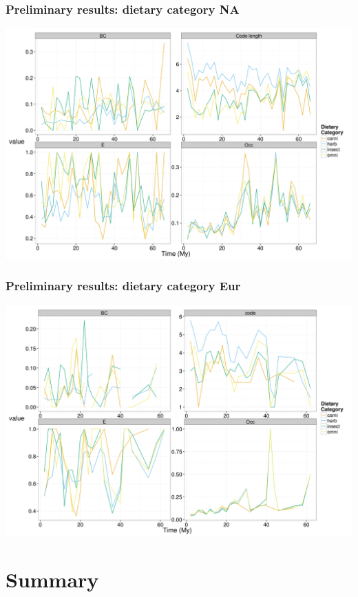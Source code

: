 \documentclass{beamer}
\begin{document}
\begin{frame}
  \frametitle{Preliminary results: dietary category NA}

  \begin{center}
    \includegraphics[height = 0.8\textheight, width = \textwidth, keepaspectratio = true]{figure/na_dt}
  \end{center}
\end{frame}

\begin{frame}
  \frametitle{Preliminary results: dietary category Eur}

  \begin{center}
    \includegraphics[height = 0.8\textheight, width = \textwidth, keepaspectratio = true]{figure/er_dt}
  \end{center}
\end{frame}


\section{Summary}
\end{document}
